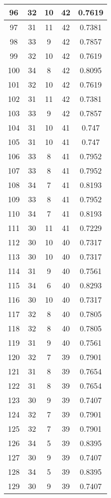 \documentclass[letterpaper, 12pt]{article}
\begin{document}
\begin{longtable}{|c|c|c|c|c|}
\hline
96 & 32 & 10 & 42 & 0.7619 \\
\hline
97 & 31 & 11 & 42 & 0.7381 \\
\hline
98 & 33 & 9 & 42 & 0.7857 \\
\hline
99 & 32 & 10 & 42 & 0.7619 \\
\hline
100 & 34 & 8 & 42 & 0.8095 \\
\hline
101 & 32 & 10 & 42 & 0.7619 \\
\hline
102 & 31 & 11 & 42 & 0.7381 \\
\hline
103 & 33 & 9 & 42 & 0.7857 \\
\hline
104 & 31 & 10 & 41 & 0.747 \\
\hline
105 & 31 & 10 & 41 & 0.747 \\
\hline
106 & 33 & 8 & 41 & 0.7952 \\
\hline
107 & 33 & 8 & 41 & 0.7952 \\
\hline
108 & 34 & 7 & 41 & 0.8193 \\
\hline
109 & 33 & 8 & 41 & 0.7952 \\
\hline
110 & 34 & 7 & 41 & 0.8193 \\
\hline
111 & 30 & 11 & 41 & 0.7229 \\
\hline
112 & 30 & 10 & 40 & 0.7317 \\
\hline
113 & 30 & 10 & 40 & 0.7317 \\
\hline
114 & 31 & 9 & 40 & 0.7561 \\
\hline
115 & 34 & 6 & 40 & 0.8293 \\
\hline
116 & 30 & 10 & 40 & 0.7317 \\
\hline
117 & 32 & 8 & 40 & 0.7805 \\
\hline
118 & 32 & 8 & 40 & 0.7805 \\
\hline
119 & 31 & 9 & 40 & 0.7561 \\
\hline
120 & 32 & 7 & 39 & 0.7901 \\
\hline
121 & 31 & 8 & 39 & 0.7654 \\
\hline
122 & 31 & 8 & 39 & 0.7654 \\
\hline
123 & 30 & 9 & 39 & 0.7407 \\
\hline
124 & 32 & 7 & 39 & 0.7901 \\
\hline
125 & 32 & 7 & 39 & 0.7901 \\
\hline
126 & 34 & 5 & 39 & 0.8395 \\
\hline
127 & 30 & 9 & 39 & 0.7407 \\
\hline
128 & 34 & 5 & 39 & 0.8395 \\
\hline
129 & 30 & 9 & 39 & 0.7407 \\

\end{longtable}
\end{document}
